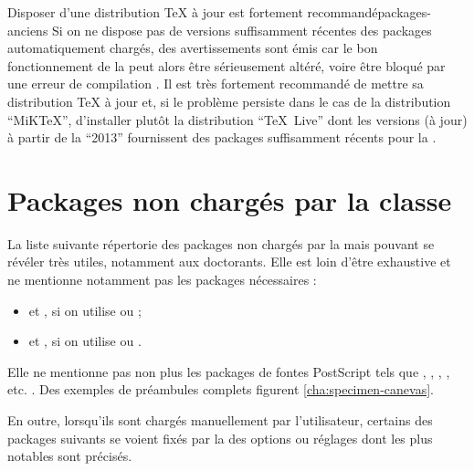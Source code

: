 \begin{dbremark}{Disposer d'une distribution \TeX{} à jour est fortement
    recommandé}{packages-anciens}
  Si on ne dispose pas de versions suffisamment récentes des packages
  automatiquement chargés, des avertissements sont émis car le bon
  fonctionnement de la \yatcl{} peut alors être sérieusement altéré, voire être
  bloqué par une erreur de compilation . Il
  est très fortement recommandé de mettre sa distribution \TeX{} à jour et, si
  le problème persiste dans le cas de la distribution \enquote{MiK\TeX{}},
  d'installer plutôt la distribution \enquote{\TeX~Live} dont les versions (à
  jour) à partir de la \enquote{2013} fournissent des packages suffisamment
  récents pour la \yatcl.
\end{dbremark}

\section{Packages non  chargés par la classe}\label{sec:packages-non-charges}

La liste suivante répertorie des packages non chargés par la \yatcl{} mais
pouvant se révéler très utiles, notamment aux doctorants.  Elle est loin d'être
exhaustive et ne mentionne notamment pas les packages nécessaires :
\begin{itemize}
\item {} et , si on utilise  ou
   ;
\item {} et , si on utilise 
  ou .
\end{itemize}
Elle ne mentionne pas non plus les packages de fontes PostScript tels que
, , , ,
etc. . Des exemples de préambules complets figurent
\vref{cha:specimen-canevas}.

En outre, lorsqu'ils sont chargés manuellement par l'utilisateur, certains des
packages suivants se voient fixés par la \yatcl{} des options ou réglages dont
les plus notables sont précisés.

